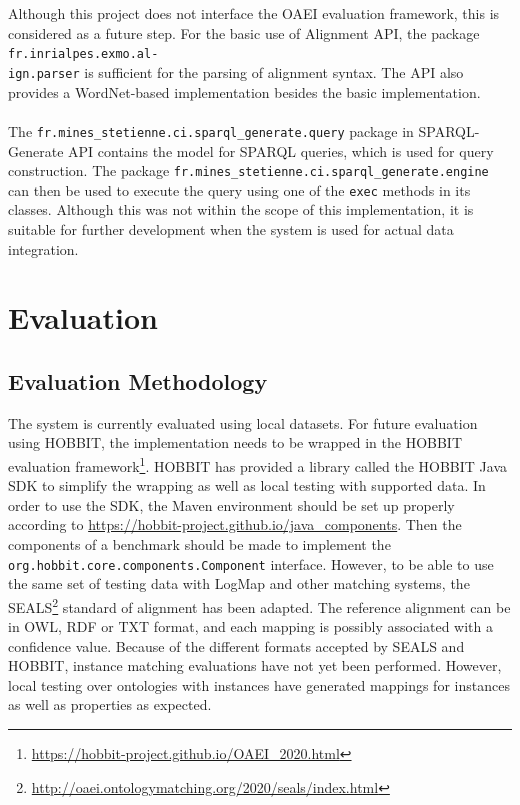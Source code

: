 \\\\
Although this project does not interface the OAEI evaluation framework, this is considered as a future step. For the basic use of Alignment API, the package \texttt{fr.inrialpes.exmo.al-\\ign.parser} is sufficient for the parsing of alignment syntax. The API also provides a WordNet-based implementation besides the basic implementation.
\\\\
The \texttt{fr.mines\_stetienne.ci.sparql\_generate.query} package in SPARQL-Generate API contains the model for SPARQL queries, which is used for query construction. The package \texttt{fr.mines\_stetienne.ci.sparql\_generate.engine} can then be used to execute the query using one of the \texttt{exec} methods in its classes. Although this was not within the scope of this implementation, it is suitable for further development when the system is used for actual data integration.


\chapter{Evaluation}

\section{Evaluation Methodology}

The system is currently evaluated using local datasets. For future evaluation using HOBBIT, the implementation needs to be wrapped in the HOBBIT evaluation framework\footnote{\url{https://hobbit-project.github.io/OAEI_2020.html}}. HOBBIT has provided a library called the HOBBIT Java SDK to simplify the wrapping as well as local testing with supported data. In order to use the SDK, the Maven environment should be set up properly according to \url{https://hobbit-project.github.io/java_components}. Then the components of a benchmark should be made to implement the \texttt{org.hobbit.core.components.Component} interface. However, to be able to use the same set of testing data with LogMap and other matching systems, the SEALS\footnote{\url{http://oaei.ontologymatching.org/2020/seals/index.html}} standard of alignment has been adapted. The reference alignment can be in OWL, RDF or TXT format, and each mapping is possibly associated with a confidence value. Because of the different formats accepted by SEALS and HOBBIT, instance matching evaluations have not yet been performed. However, local testing over ontologies with instances have generated mappings for instances as well as properties as expected.

